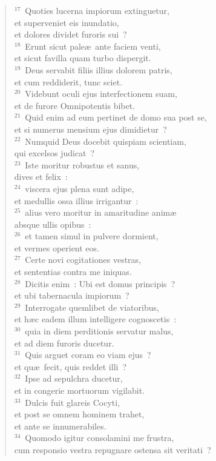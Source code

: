 \begin{flushleft}
\begin{verse}
${}^{17}$~Quoties lucerna impiorum extinguetur,\\ et superveniet eis inundatio,\\ et dolores dividet furoris sui~?\\
${}^{18}$~Erunt sicut pale\ae\ ante faciem venti,\\ et sicut favilla quam turbo dispergit.\\
${}^{19}$~Deus servabit filiis illius dolorem patris,\\ et cum reddiderit, tunc sciet.\\
${}^{20}$~Videbunt oculi ejus interfectionem suam,\\ et de furore Omnipotentis bibet.\\
${}^{21}$~Quid enim ad eum pertinet de domo sua post se,\\ et si numerus mensium ejus dimidietur~?\\
${}^{22}$~Numquid Deus docebit quispiam scientiam,\\ qui excelsos judicat~?\\
${}^{23}$~Iste moritur robustus et sanus,\\ dives et felix~:\\
${}^{24}$~viscera ejus plena sunt adipe,\\ et medullis ossa illius irrigantur~:\\
${}^{25}$~alius vero moritur in amaritudine anim\ae \\ absque ullis opibus~:\\
${}^{26}$~et tamen simul in pulvere dormient,\\ et vermes operient eos.\\
${}^{27}$~Certe novi cogitationes vestras,\\ et sententias contra me iniquas.\\
${}^{28}$~Dicitis enim~: Ubi est domus principis~?\\ et ubi tabernacula impiorum~?\\
${}^{29}$~Interrogate quemlibet de viatoribus,\\ et h\ae c eadem illum intelligere cognoscetis~:\\
${}^{30}$~quia in diem perditionis servatur malus,\\ et ad diem furoris ducetur.\\
${}^{31}$~Quis arguet coram eo viam ejus~?\\ et qu\ae\ fecit, quis reddet illi~?\\
${}^{32}$~Ipse ad sepulchra ducetur,\\ et in congerie mortuorum vigilabit.\\
${}^{33}$~Dulcis fuit glareis Cocyti,\\ et post se omnem hominem trahet,\\ et ante se innumerabiles.\\
${}^{34}$~Quomodo igitur consolamini me frustra,\\ cum responsio vestra repugnare ostensa sit veritati~?\end{verse}\end{flushleft}



